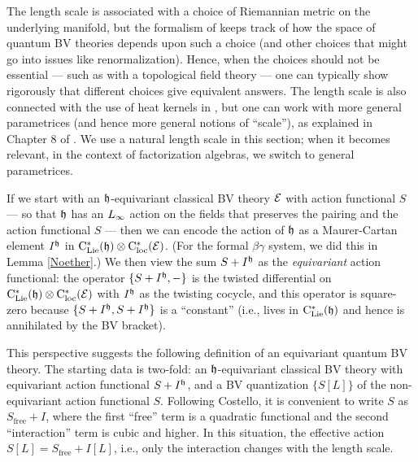 \begin{rmk}
The length scale is associated with a choice of Riemannian metric on the underlying manifold,
but the formalism of \cite{CosBook} keeps track of how the space of quantum BV theories depends upon such a choice 
(and other choices that might go into issues like renormalization).
Hence, when the choices should not be essential --- such as with a topological field theory --- one can typically show rigorously that different choices give equivalent answers.
The length scale is also connected with the use of heat kernels in \cite{CosBook},
but one can work with more general parametrices (and hence more general notions of ``scale''),
as explained in Chapter 8 of \cite{CG}.
We use a natural length scale in this section; 
when it becomes relevant, in the context of factorization algebras, we switch to general parametrices.
\end{rmk}

If we start with an $\mathfrak h$-equivariant classical BV theory $\mathcal E$ with action functional $S$ --- so that $\mathfrak h$ has an $\L8$ action on the fields that preserves the pairing and the action functional $S$ --- then we can encode the action of $\mathfrak h$ as a Maurer-Cartan element $I^\mathfrak h$ in ${\rm C}_{\rm Lie}^*(\mathfrak h) \otimes {\rm C}^*_{\rm loc}(\mathcal E)$.
(For the formal $\beta\gamma$ system, we did this in Lemma \ref{Noether}.)
We then view the sum $S + I^\mathfrak h$ as the \emph{equivariant} action functional:
the operator $\{S+ I^\mathfrak h,-\}$ is the twisted differential on ${\rm C}_{\rm Lie}^*(\mathfrak h) \otimes {\rm C}^*_{\rm loc}(\mathcal E)$ with $I^\mathfrak h$ as the twisting cocycle,
and this operator is square-zero because $\{S + I^\mathfrak h, S+ I^\mathfrak h\}$ is a ``constant'' (i.e., lives in ${\rm C}_{\rm Lie}^*(\mathfrak h)$ and hence is annihilated by the BV bracket).

This perspective suggests the following definition of an equivariant quantum BV theory.
The starting data is two-fold:
an $\mathfrak h$-equivariant classical BV theory with equivariant action functional $S+I^\mathfrak h$, 
and a BV quantization $\{S[L]\}$ of the non-equivariant action functional $S$.
Following Costello, it is convenient to write $S$ as $S_{\text{free}} + I$, 
where the first ``free'' term is a quadratic functional and the second ``interaction'' term is cubic and higher.
In this situation, the effective action $S[L] = S_{\text{free}} + I[L]$, 
i.e., only the interaction changes with the length scale.

